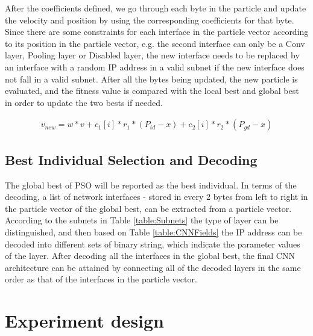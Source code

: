 \documentclass[conference]{IEEEtran}
\begin{document}
After the coefficients defined, we go through each byte in the particle and update the velocity and position by using the corresponding coefficients for that byte. Since there are some constraints for each interface in the particle vector according to its position in the particle vector, e.g. the second interface can only be a Conv layer, Pooling layer or Disabled layer, the new interface needs to be replaced by an interface with a random IP address in a valid subnet if the new interface does not fall in a valid subnet. After all the bytes being updated, the new particle is evaluated, and the fitness value is compared with the local best and global best in order to update the two bests if needed.

\begin{equation}\label{eq:UpdateVNew}
\begin{aligned}
v_{new} = w * v + c_{1}[i] * r_{1} * (P_{id} - x) + c_{2}[i] * r_{2} * (P_{gd} - x)
\end{aligned}
\end{equation}


\subsection{Best Individual Selection and Decoding}

The global best of PSO will be reported as the best individual. In terms of the decoding, a list of network interfaces - stored in every 2 bytes from left to right in the particle vector of the global best, can be extracted from a particle vector. According to the subnets in Table \ref{table:Subnets} the type of layer can be distinguished, and then based on Table \ref{table:CNNFields} the IP address can be decoded into different sets of binary string, which indicate the parameter values of the layer. After decoding all the interfaces in the global best, the final CNN architecture can be attained by connecting all of the decoded layers in the same order as that of the interfaces in the particle vector.

\section{Experiment design}\label{sec:EPDesign}

\end{document}
